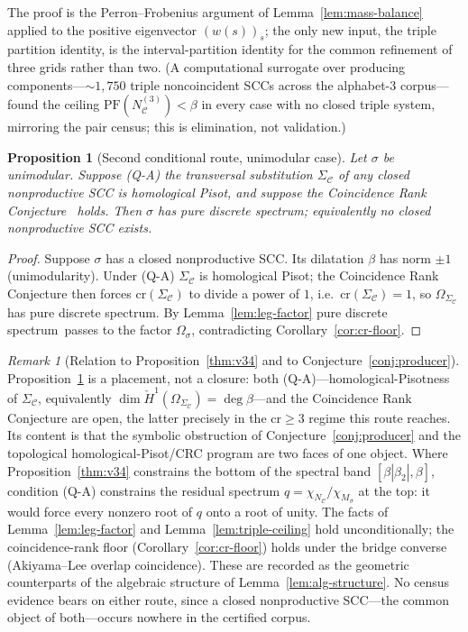 \documentclass[11pt]{article}
\theoremstyle{plain}
\newtheorem{proposition}[theorem]{Proposition}
\theoremstyle{definition}
\theoremstyle{remark}
\newtheorem{remark}[theorem]{Remark}
\newcommand{\PDS}{pure discrete spectrum}
\newcommand{\C}{\mathcal{C}}
\newcommand{\PFroot}{\mathrm{PF}}
\begin{document}
\noindent The proof is the Perron--Frobenius argument of Lemma~\ref{lem:mass-balance} applied to the positive eigenvector $(w(s))_s$; the only new input, the triple partition identity, is the interval-partition identity for the common refinement of three grids rather than two. (A computational surrogate over producing components---$\sim 1{,}750$ triple noncoincident SCCs across the alphabet-$3$ corpus---found the ceiling $\PFroot(N_\C^{(3)})<\beta$ in every case with no closed triple system, mirroring the pair census; this is elimination, not validation.)

\begin{proposition}[Second conditional route, unimodular case]\label{prop:qa-crc}
Let $\sigma$ be unimodular. Suppose (Q\nobreakdash-A) the transversal substitution $\Sigma_\C$ of any closed nonproductive SCC is homological Pisot, and suppose the Coincidence Rank Conjecture~\textup{\cite{BBJS}} holds. Then $\sigma$ has \PDS; equivalently no closed nonproductive SCC exists.
\end{proposition}

\begin{proof}
Suppose $\sigma$ has a closed nonproductive SCC. Its dilatation $\beta$ has norm $\pm 1$ (unimodularity). Under (Q\nobreakdash-A) $\Sigma_\C$ is homological Pisot; the Coincidence Rank Conjecture then forces $\mathrm{cr}(\Sigma_\C)$ to divide a power of $1$, i.e.\ $\mathrm{cr}(\Sigma_\C)=1$, so $\Omega_{\Sigma_\C}$ has \PDS. By Lemma~\ref{lem:leg-factor} \PDS\ passes to the factor $\Omega_\sigma$, contradicting Corollary~\ref{cor:cr-floor}.
\end{proof}

\begin{remark}[Relation to Proposition~\ref{thm:v34} and to Conjecture~\ref{conj:producer}]\label{rem:two-faces}
Proposition~\ref{prop:qa-crc} is a placement, not a closure: both (Q\nobreakdash-A)---homological-Pisotness of $\Sigma_\C$, equivalently $\dim\check H^1(\Omega_{\Sigma_\C})=\deg\beta$---and the Coincidence Rank Conjecture are open, the latter precisely in the $\mathrm{cr}\ge 3$ regime this route reaches. Its content is that the symbolic obstruction of Conjecture~\ref{conj:producer} and the topological homological-Pisot/CRC program are two faces of one object. Where Proposition~\ref{thm:v34} constrains the bottom of the spectral band $[\beta|\beta_2|,\beta]$, condition (Q\nobreakdash-A) constrains the residual spectrum $q=\chi_{N_\C}/\chi_{M_\sigma}$ at the top: it would force every nonzero root of $q$ onto a root of unity. The facts of Lemma~\ref{lem:leg-factor} and Lemma~\ref{lem:triple-ceiling} hold unconditionally; the coincidence-rank floor (Corollary~\ref{cor:cr-floor}) holds under the bridge converse (Akiyama--Lee overlap coincidence). These are recorded as the geometric counterparts of the algebraic structure of Lemma~\ref{lem:alg-structure}. No census evidence bears on either route, since a closed nonproductive SCC---the common object of both---occurs nowhere in the certified corpus.
\end{remark}
\end{document}
